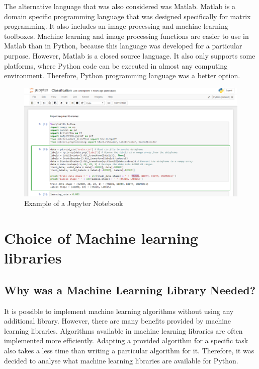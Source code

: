 The alternative language that was also considered was Matlab. Matlab is a domain specific programming language that was designed specifically for matrix programming. It also includes an image processing and machine learning toolboxes. Machine learning and image processing functions are easier to use in Matlab than in Python, because this language was developed for a particular purpose. However, Matlab is a closed source language. It also only supports some platforms, where Python code can be executed in almost any computing environment. Therefore, Python programming language was a better option.

\begin{figure}[ht]
\centering
\includegraphics[width=14cm]{Figures/c3/c3jupyter.PNG}
\caption{Example of a Jupyter Notebook}
\label{fig:jupyter}
\end{figure}


\section{Choice of Machine learning libraries}

\subsection{Why was a Machine Learning Library Needed?}

It is possible to implement machine learning algorithms without using any additional library. However, there are many benefits provided by machine learning libraries. Algorithms available in machine learning libraries  are often implemented more efficiently. Adapting a provided algorithm for a specific task also takes a less time  than  writing a particular algorithm for it. Therefore, it was decided to analyse what machine learning libraries  are available for Python.

